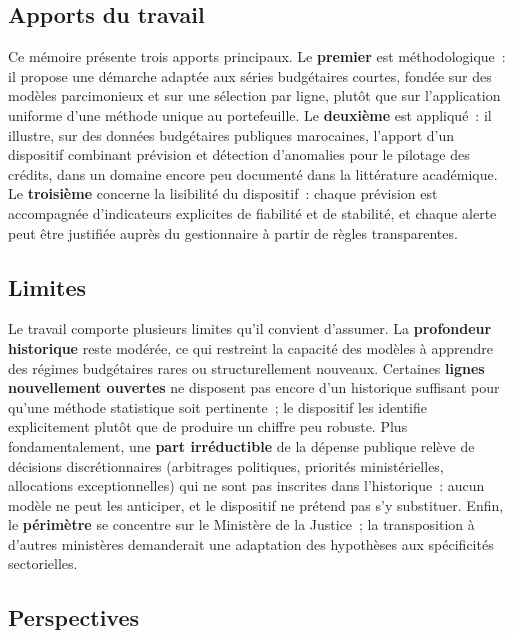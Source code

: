 \documentclass[12pt,a4paper]{article}
\begin{document}
\subsection*{Apports du travail}

Ce m\'emoire pr\'esente trois apports principaux. Le \textbf{premier} est
m\'ethodologique~: il propose une d\'emarche adapt\'ee aux s\'eries
budg\'etaires courtes, fond\'ee sur des mod\`eles parcimonieux et sur une
s\'election par ligne, plut\^ot que sur l'application uniforme d'une
m\'ethode unique au portefeuille. Le \textbf{deuxi\`eme} est appliqu\'e~: il
illustre, sur des donn\'ees budg\'etaires publiques marocaines, l'apport
d'un dispositif combinant pr\'evision et d\'etection d'anomalies pour le
pilotage des cr\'edits, dans un domaine encore peu document\'e dans la
litt\'erature acad\'emique. Le \textbf{troisi\`eme} concerne la lisibilit\'e
du dispositif~: chaque pr\'evision est accompagn\'ee d'indicateurs explicites
de fiabilit\'e et de stabilit\'e, et chaque alerte peut \^etre justifi\'ee
aupr\`es du gestionnaire \`a partir de r\`egles transparentes.

\subsection*{Limites}

Le travail comporte plusieurs limites qu'il convient d'assumer. La
\textbf{profondeur historique} reste mod\'er\'ee, ce qui restreint la
capacit\'e des mod\`eles \`a apprendre des r\'egimes budg\'etaires rares ou
structurellement nouveaux. Certaines \textbf{lignes nouvellement ouvertes}
ne disposent pas encore d'un historique suffisant pour qu'une m\'ethode
statistique soit pertinente~; le dispositif les identifie explicitement
plut\^ot que de produire un chiffre peu robuste. Plus fondamentalement,
une \textbf{part irr\'eductible} de la d\'epense publique rel\`eve de
d\'ecisions discr\'etionnaires (arbitrages politiques, priorit\'es
minist\'erielles, allocations exceptionnelles) qui ne sont pas inscrites
dans l'historique~: aucun mod\`ele ne peut les anticiper, et le dispositif
ne pr\'etend pas s'y substituer. Enfin, le \textbf{p\'erim\`etre}
se concentre sur le Minist\`ere de la Justice~; la transposition \`a
d'autres minist\`eres demanderait une adaptation des hypoth\`eses aux
sp\'ecificit\'es sectorielles.

\subsection*{Perspectives}
\end{document}
